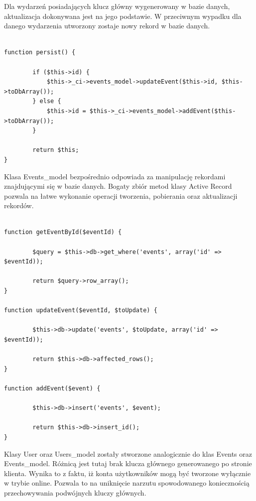 Dla wydarzeń posiadających klucz główny wygenerowany w bazie danych, aktualizacja dokonywana jest na jego podstawie. W przeciwnym wypadku dla danego wydarzenia utworzony zostaje nowy rekord w bazie danych.

\begin{lstlisting}[caption=Aktualizacja obiektu Event w bazie danych., label=amb, captionpos=b]

function persist() {

    	if ($this->id) {
        	$this->_ci->events_model->updateEvent($this->id, $this->toDbArray());
    	} else {
        	$this->id = $this->_ci->events_model->addEvent($this->toDbArray());
    	}

    	return $this;
}

\end{lstlisting}

Klasa Events\_model bezpośrednio odpowiada za manipulację rekordami znajdującymi się w bazie danych. Bogaty zbiór metod klasy Active Record pozwala na łatwe wykonanie operacji tworzenia, pobierania oraz aktualizacji rekordów.

\begin{lstlisting}[caption=Przykładowe metody klasy Events\_model odpowiedzialne za komunikację z bazą danych., label=amb, captionpos=b]

function getEventById($eventId) {

    	$query = $this->db->get_where('events', array('id' => $eventId));

    	return $query->row_array();
}

function updateEvent($eventId, $toUpdate) {

    	$this->db->update('events', $toUpdate, array('id' => $eventId));

    	return $this->db->affected_rows();
}

function addEvent($event) {

    	$this->db->insert('events', $event);

    	return $this->db->insert_id();
}

\end{lstlisting}

Klasy User oraz Users\_model zostały stworzone analogicznie do klas Events oraz Events\_model. Różnicą jest tutaj brak klucza głównego generowanego po stronie klienta. Wynika to z faktu, iż konta użytkowników mogą być tworzone wyłącznie w trybie online. Pozwala to na uniknięcie narzutu spowodowanego koniecznością przechowywania podwójnych kluczy głównych.

